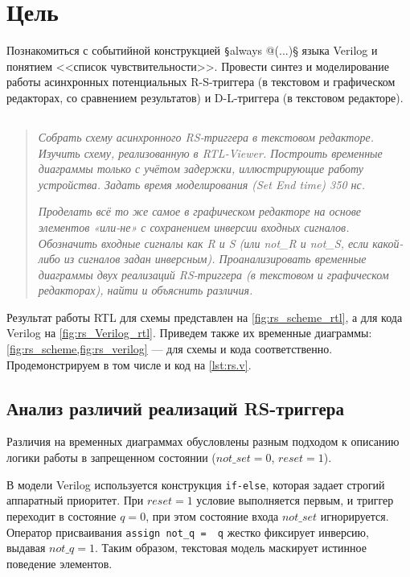 \section*{Цель}
Познакомиться с событийной конструкцией \texttt§always @(...)§ языка Verilog и понятием <<список чувствительности>>. Провести синтез и моделирование работы асинхронных потенциальных R-S-триггера (в текстовом и графическом редакторах, со сравнением результатов) и D-L-триггера (в текстовом редакторе).

\subsection*{  }
\begin{quote}
    \textit{Собрать схему асинхронного RS-триггера в текстовом редакторе. Изучить схему, реализованную в RTL-Viewer. Построить временные диаграммы только с учётом задержки, иллюстрирующие работу устройства. Задать время моделирования (Set End time) 350 нс. }

    \textit{Проделать всё то же самое в графическом редакторе на основе элементов «или-не» с сохранением инверсии входных сигналов. Обозначить входные сигналы как R и S (или not\_R и not\_S, если какой-либо из сигналов задан инверсным). Проанализировать временные диаграммы двух реализаций RS-триггера (в текстовом и графическом редакторах), найти и объяснить различия.}
\end{quote}
 
Результат работы RTL для схемы представлен на \cref{fig:rs_scheme_rtl}, а для кода Verilog на \cref{fig:rs_Verilog_rtl}. Приведем также их временные диаграммы: \cref{fig:rs_scheme,fig:rs_verilog} --- для схемы и кода соответственно. Продемонстрируем в том числе и код на \cref{lst:rs.v}.

\subsection*{Анализ различий реализаций RS-триггера}

Различия на временных диаграммах обусловлены разным подходом к описанию логики работы в запрещенном состоянии ($not\_set = 0$, $reset = 1$).

В модели Verilog используется конструкция \texttt{if-else}, которая задает строгий аппаратный приоритет. При $reset = 1$ условие выполняется первым, и триггер переходит в состояние $q = 0$, при этом состояние входа $not\_set$ игнорируется. Оператор присваивания \texttt{assign not_q = ~q} жестко фиксирует инверсию, выдавая $not\_q = 1$. Таким образом, текстовая модель маскирует истинное поведение элементов.

